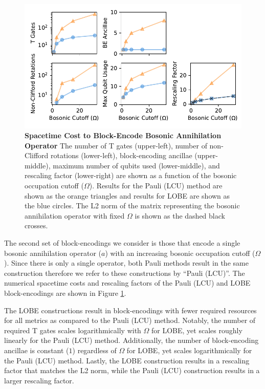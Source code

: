 \begin{figure}
    \centering
    \includegraphics[width=14cm]{figures/bosonic-comparison.pdf}
    \caption{
        \textbf{Spacetime Cost to Block-Encode Bosonic Annihilation Operator}
        The number of T gates (upper-left), number of non-Clifford rotations (lower-left), block-encoding ancillae (upper-middle), maximum number of qubits used (lower-middle), and rescaling factor (lower-right) are shown as a function of the bosonic occupation cutoff ($\Omega$).
        Results for the Pauli (LCU) method are shown as the orange triangles and results for LOBE are shown as the blue circles.
        The L2 norm of the matrix representing the bosonic annihilation operator with fixed $\Omega$ is shown as the dashed black crosses. 
    }
    \label{fig:bosonic-comparison}
\end{figure}

The second set of block-encodings we consider is those that encode a single bosonic annihilation operator ($a$) with an increasing bosonic occupation cutoff ($\Omega$).
Since there is only a single operator, both Pauli methods result in the same construction therefore we refer to these constructions by ``Pauli (LCU)''.
The numerical spacetime costs and rescaling factors of the Pauli (LCU) and LOBE block-encodings are shown in Figure \ref{fig:bosonic-comparison}.

The LOBE constructions result in block-encodings with fewer required resources for all metrics as compared to the Pauli (LCU) method.
Notably, the number of required T gates scales logarithmically with $\Omega$ for LOBE, yet scales roughly linearly for the Pauli (LCU) method.
Additionally, the number of block-encoding ancillae is constant ($1$) regardless of $\Omega$ for LOBE, yet scales logarithmically for the Pauli (LCU) method.
Lastly, the LOBE construction results in a rescaling factor that matches the L2 norm, while the Pauli (LCU) construction results in a larger rescaling factor.

